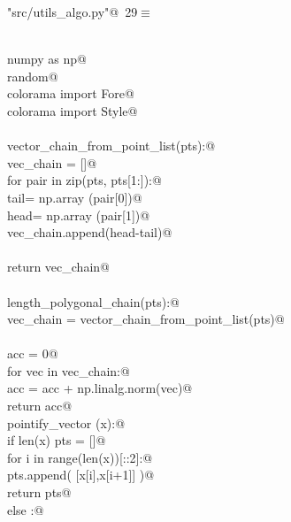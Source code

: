 \documentclass[10pt, english, oneside]{report}
\begin{document}
\begin{appendices}
\begin{flushleft} \small\label{scrap32}\raggedright\small
{} \verb@"src/utils_algo.py"@\nobreak\ {\footnotesize {29}}$\equiv$
\vspace{-1ex}
\begin{list}{}{} \item
\mbox{}\verb@@\\
\mbox{}\verb@import numpy as np@\\
\mbox{}\verb@import random@\\
\mbox{}\verb@from colorama import Fore@\\
\mbox{}\verb@from colorama import Style@\\
\mbox{}\verb@@\\
\mbox{}\verb@def vector_chain_from_point_list(pts):@\\
\mbox{}\verb@    vec_chain = []@\\
\mbox{}\verb@    for pair in zip(pts, pts[1:]):@\\
\mbox{}\verb@        tail= np.array (pair[0])@\\
\mbox{}\verb@        head= np.array (pair[1])@\\
\mbox{}\verb@        vec_chain.append(head-tail)@\\
\mbox{}\verb@@\\
\mbox{}\verb@    return vec_chain@\\
\mbox{}\verb@@\\
\mbox{}\verb@def length_polygonal_chain(pts):@\\
\mbox{}\verb@    vec_chain = vector_chain_from_point_list(pts)@\\
\mbox{}\verb@@\\
\mbox{}\verb@    acc = 0@\\
\mbox{}\verb@    for vec in vec_chain:@\\
\mbox{}\verb@        acc = acc + np.linalg.norm(vec)@\\
\mbox{}\verb@    return acc@\\
\mbox{}\verb@def pointify_vector (x):@\\
\mbox{}\verb@    if len(x) % 2 == 0:@\\
\mbox{}\verb@        pts = []@\\
\mbox{}\verb@        for i in range(len(x))[::2]:@\\
\mbox{}\verb@            pts.append( [x[i],x[i+1]] )@\\
\mbox{}\verb@        return pts@\\
\mbox{}\verb@    else :@\\

\end{list}
\end{flushleft}
\end{appendices}
\end{document}
